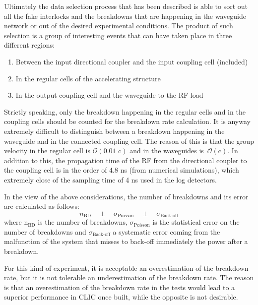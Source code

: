 Ultimately the data selection process that has been described is able to sort out all the fake interlocks and the breakdowns that are happening in the waveguide network or out of the desired experimental conditions. The product of such selection is a group of interesting events that can have taken place in three different regions:
\begin{enumerate}
\item Between the input directional coupler and the input coupling cell (included)
\item In the regular cells of the accelerating structure
\item In the output coupling cell and the waveguide to the RF load
\end{enumerate}
Strictly speaking, only the breakdown happening in the regular cells and in the coupling cells should be counted for the breakdown rate calculation. It is anyway extremely difficult to distinguish between a breakdown happening in the waveguide and in the connected coupling cell. The reason of this is that the group velocity in the regular cell is $\mathcal{O}(\text{0.01 c})$ and in the waveguides is~$\mathcal{O}(\text{c})$. In addition to this, the propagation time of the RF from the directional coupler to the coupling cell is in the order of 4.8 ns (from numerical simulations), which extremely close of the sampling time of 4 ns used in the log detectors. 

In the view of the above considerations, the number of breakdowns and its error are calculated as follows:
\begin{equation}
n_{\text{BD}} \quad \pm \quad \sigma_{\text{Poisson}} \quad \pm \quad \sigma_{\text{Back-off}} 
\label{numBD}
\end{equation}
where  n$_{\text{BD}}$ is the number of breakdowns, $\sigma_{\text{Poisson}}$ is the statistical error on the number of breakdowns and $\sigma_{\text{Back-off}}$ a systematic error coming from the malfunction of the system that misses to back-off immediately the power after a breakdown.

For this kind of experiment, it is acceptable an overestimation of the breakdown rate, but it is not tolerable an underestimation of the breakdown rate. The reason is that an overestimation of the breakdown rate in the tests would lead to a superior performance in CLIC once built, while the opposite is not desirable.   


